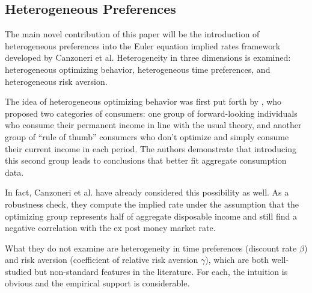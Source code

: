 \documentclass{hw}
\begin{document}
\subsection{Heterogeneous Preferences}
The main novel contribution of this paper will be the introduction of heterogeneous preferences into the Euler equation implied rates framework developed by Canzoneri et al. Heterogeneity in three dimensions is examined: heterogeneous optimizing behavior, heterogeneous time preferences, and heterogeneous risk aversion.

The idea of heterogeneous optimizing behavior was first put forth by \cite{campbell89}, who proposed two categories of consumers: one group of forward-looking individuals who consume their permanent income in line with the usual theory, and another group of ``rule of thumb'' consumers who don't optimize and simply consume their current income in each period. The authors demonstrate that introducing this second group leads to conclusions that better fit aggregate consumption data.

In fact, Canzoneri et al. have already considered this possibility as well. As a robustness check, they compute the implied rate under the assumption that the optimizing group represents half of aggregate disposable income and still find a negative correlation with the ex post money market rate.

What they do not examine are heterogeneity in time preferences (discount rate $\beta$) and risk aversion (coefficient of relative risk aversion $\gamma$), which are both well-studied but non-standard features in the literature. For each, the intuition is obvious and the empirical support is considerable.
\end{document}
